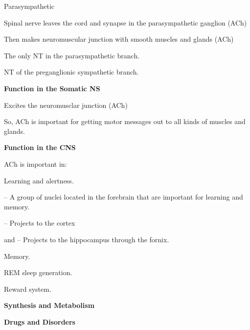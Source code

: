 \begin{coloredlist}
\begin{coloredlist}
\begin{coloredlist}
\begin{coloredlist}
            \end{coloredlist}
            \item Parasympathetic
            \begin{coloredlist}
                \item Spinal nerve leaves the cord and synapse in the parasympathetic ganglion (ACh)
                \item Then makes neuromuscular junction with smooth muscles and glands (ACh)
            \end{coloredlist}
            \item The only NT in the parasympathetic branch.
            \item NT of the preganglionic sympathetic branch.
        \end{coloredlist}
        \item \textbf{Function in the Somatic NS}
        \begin{coloredlist}
            \item Excites the neuromusclar junction (ACh)
            \item So, ACh is important for getting motor messages out to all kinds of muscles and glands.
        \end{coloredlist}
        \item \textbf{Function in the CNS}
        \begin{coloredlist}
            \item ACh is important in:
            \begin{coloredlist}
                \item Learning and alertness.
                \begin{coloredlist}
                    \item {} -- A group of nuclei located in the forebrain that are important for learning and memory.
                    \begin{coloredlist}
                        \item {} -- Projects to the cortex
                        \item {} and  -- Projects to the hippocampus through the fornix.
                    \end{coloredlist}
                \end{coloredlist}
                \item Memory.
                \item REM sleep generation.
                \item Reward system.
            \end{coloredlist}
        \end{coloredlist}
    \end{coloredlist}
    \item \textbf{Synthesis and Metabolism}
    \item \textbf{Drugs and Disorders}
\end{coloredlist}